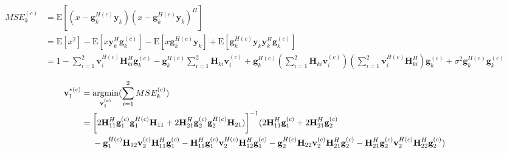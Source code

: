 \documentclass[11pt, oneside]{article}   	%
\begin{document}
\begin{align*}
MSE^{(c)}_{k} &= \mathrm{E}	[	(	x-\textbf{g}^{H(c)}_{k}	\textbf{y}_{k}	)(x-\textbf{g}^{H(c)}_{k}	\textbf{y}_{k})^{H}	] \\
		       & = \mathrm{E}[x^{2}]	 - \mathrm{E}[x	\textbf{y}_{k}^{H} \textbf{g}^{(c)}_{k}]	
		       					-  \mathrm{E}[x	\textbf{g}_{k}^{H(c)} \textbf{y}_{k}]
							+ \mathrm{E}[\textbf{g}_{k}^{H(c)} \textbf{y}_{k}	\textbf{y}_{k}^{H} \textbf{g}^{(c)}_{k}]			\\
		       & = 1 - \displaystyle\sum_{i=1}^{2}	\textbf{v}^{H(c)}_{i}	\textbf{H}^{H}_{ki}	\textbf{g}^{(c)}_{k}
		       		- \textbf{g}^{H(c)}_{k}		\displaystyle\sum_{i=1}^{2}	\textbf{H}_{ki}	\textbf{v}^{(c)}_{i}
				+\textbf{g}^{H(c)}_{k}		(\displaystyle\sum_{i=1}^{2}\textbf{H}_{ki}\textbf{v}^{(c)}_{i})
									(\displaystyle\sum_{i=1}^{2}\textbf{v}^{H(c)}_{i}\textbf{H}^{H}_{ki})	\textbf{g}^{(c)}_{k}
				+\sigma^2		\textbf{g}^{H(c)}_{k}	 \textbf{g}^{(c)}_{k}
\end{align*}

\begin{align*}
\textbf{v}^{*(c)}_{1}  &= \operatornamewithlimits{argmin}_{\textbf{v}^{(c)}_{1}}	(\displaystyle\sum_{i=1}^{2}	MSE^{(c)}_{k})	\\
			       &=\bigg[ 2	\textbf{H}^{H}_{11}	\textbf{g}^{(c)}_{1}	\textbf{g}^{H(c)}_{1}		\textbf{H}_{11}
				   +	2	\textbf{H}^{H}_{21}	\textbf{g}^{(c)}_{2}	\textbf{g}^{H(c)}_{2}		\textbf{H}_{21})
				   \bigg]^{-1} 
				   (2	\textbf{H}^{H}_{11}	\textbf{g}^{(c)}_{1}	+	2	\textbf{H}^{H}_{21}	\textbf{g}^{(c)}_{2}	\\
				   &\ \ \ \ -	\textbf{g}^{H(c)}_{1}	\textbf{H}_{12}	\textbf{v}^{(c)}_{2} 	\textbf{H}^{H}_{11}	\textbf{g}^{(c)}_{1}
				   -	\textbf{H}^{H}_{11}	\textbf{g}^{(c)}_{1}	\textbf{v}^{H(c)}_{2}	\textbf{H}^{H}_{12}	\textbf{g}^{(c)}_{1}
				   -	\textbf{g}^{H(c)}_{2}	\textbf{H}_{22}	\textbf{v}^{(c)}_{2} 	\textbf{H}^{H}_{21}	\textbf{g}^{(c)}_{2}
				   -	\textbf{H}^{H}_{21}	\textbf{g}^{(c)}_{2}	\textbf{v}^{H(c)}_{2}	\textbf{H}^{H}_{22}	\textbf{g}^{(c)}_{2}
				   )
\end{align*}
\end{document}
